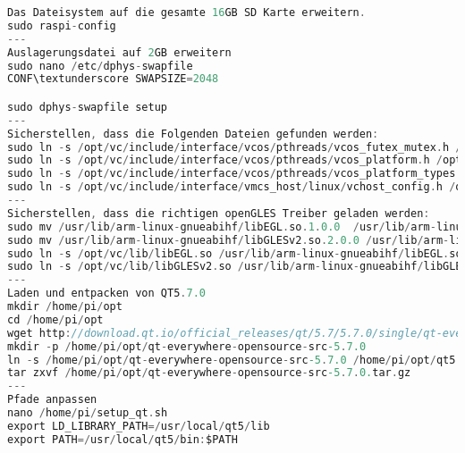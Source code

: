 \begin{lstlisting}[frame=single,breaklines=true,basicstyle=\tiny,language=C,label={QT5.7compile},caption={Skizze zur Installation von Qt5.7}]
Das Dateisystem auf die gesamte 16GB SD Karte erweitern.
sudo raspi-config
---
Auslagerungsdatei auf 2GB erweitern 
sudo nano /etc/dphys-swapfile 
CONF\textunderscore SWAPSIZE=2048 

sudo dphys-swapfile setup 
---
Sicherstellen, dass die Folgenden Dateien gefunden werden:
sudo ln -s /opt/vc/include/interface/vcos/pthreads/vcos_futex_mutex.h /opt/vc/include/interface/vcos/vcos_futex_mutex.h
sudo ln -s /opt/vc/include/interface/vcos/pthreads/vcos_platform.h /opt/vc/include/interface/vcos/vcos_platform.h
sudo ln -s /opt/vc/include/interface/vcos/pthreads/vcos_platform_types.h /opt/vc/include/interface/vcos/vcos_platform_types.h
sudo ln -s /opt/vc/include/interface/vmcs_host/linux/vchost_config.h /opt/vc/include/interface/vmcs_host/vchost_config.h
---
Sicherstellen, dass die richtigen openGLES Treiber geladen werden:
sudo mv /usr/lib/arm-linux-gnueabihf/libEGL.so.1.0.0  /usr/lib/arm-linux-gnueabihf/libEGL.so.1.0.0.backup
sudo mv /usr/lib/arm-linux-gnueabihf/libGLESv2.so.2.0.0 /usr/lib/arm-linux-gnueabihf/libGLESv2.so.2.0.0.backup
sudo ln -s /opt/vc/lib/libEGL.so /usr/lib/arm-linux-gnueabihf/libEGL.so.1.0.0
sudo ln -s /opt/vc/lib/libGLESv2.so /usr/lib/arm-linux-gnueabihf/libGLESv2.so.2.0.0
---
Laden und entpacken von QT5.7.0
mkdir /home/pi/opt
cd /home/pi/opt
wget http://download.qt.io/official_releases/qt/5.7/5.7.0/single/qt-everywhere-opensource-src-5.7.0.tar.gz
mkdir -p /home/pi/opt/qt-everywhere-opensource-src-5.7.0
ln -s /home/pi/opt/qt-everywhere-opensource-src-5.7.0 /home/pi/opt/qt5
tar zxvf /home/pi/opt/qt-everywhere-opensource-src-5.7.0.tar.gz
---
Pfade anpassen
nano /home/pi/setup_qt.sh
export LD_LIBRARY_PATH=/usr/local/qt5/lib
export PATH=/usr/local/qt5/bin:$PATH


\end{lstlisting}
